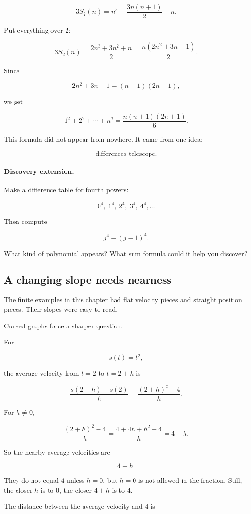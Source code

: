 \[
3S_2(n)
=
n^3+\frac{3n(n+1)}{2}-n.
\]

Put everything over \(2\):

\[
3S_2(n)
=
\frac{2n^3+3n^2+n}{2}
=
\frac{n(2n^2+3n+1)}{2}.
\]

Since

\[
2n^2+3n+1=(n+1)(2n+1),
\]

we get

\[
\boxed{
1^2+2^2+\cdots+n^2
=
\frac{n(n+1)(2n+1)}{6}.
}
\]

This formula did not appear from nowhere. It came from one idea:

\[
\text{differences telescope}.
\]

\paragraph{Discovery extension.}
Make a difference table for fourth powers:

\[
0^4,\ 1^4,\ 2^4,\ 3^4,\ 4^4,\ldots
\]

Then compute

\[
j^4-(j-1)^4.
\]

What kind of polynomial appears? What sum formula could it help you discover?

\subsection{A changing slope needs nearness}
\label{subsec:changing-slope-needs-nearness}

The finite examples in this chapter had flat velocity pieces and straight position pieces. Their slopes were easy to read.

Curved graphs force a sharper question.

For

\[
s(t)=t^2,
\]

the average velocity from \(t=2\) to \(t=2+h\) is

\[
\frac{s(2+h)-s(2)}{h}
=
\frac{(2+h)^2-4}{h}.
\]

For \(h\neq 0\),

\[
\frac{(2+h)^2-4}{h}
=
\frac{4+4h+h^2-4}{h}
=
4+h.
\]

So the nearby average velocities are

\[
4+h.
\]

They do not equal \(4\) unless \(h=0\), but \(h=0\) is not allowed in the fraction. Still, the closer \(h\) is to \(0\), the closer \(4+h\) is to \(4\).

The distance between the average velocity and \(4\) is

